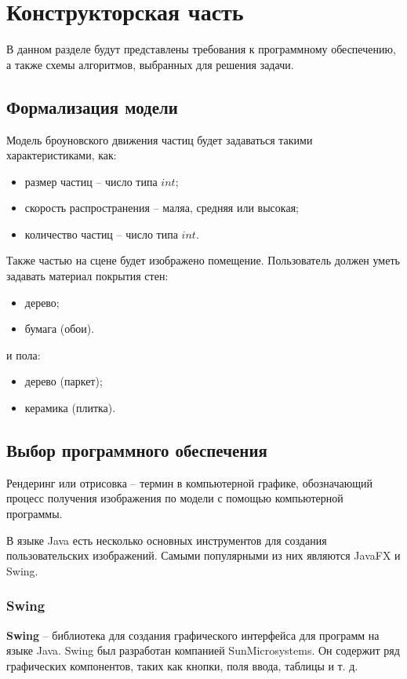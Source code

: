 \chapter{Конструкторская часть}

В данном разделе будут представлены требования к программному обеспечению, а также схемы алгоритмов, выбранных для решения задачи.

\section{Формализация модели}
Модель броуновского движения частиц будет задаваться такими характеристиками, как:
\begin{itemize} 
	\item размер частиц -- число типа $int$;
	\item скорость распространения -- маляа, средняя или высокая;
	\item количество частиц -- число типа $int$.
\end{itemize}

Также частью на сцене будет изображено помещение. Пользователь должен уметь задавать материал покрытия стен:
\begin{itemize} 
	\item дерево;
	\item бумага (обои).
\end{itemize}
и пола:
\begin{itemize} 
	\item дерево (паркет);
	\item керамика (плитка).
\end{itemize}

\section{Выбор программного обеспечения}

Рендеринг или отрисовка -- термин в компьютерной графике, обозначающий процесс получения изображения по модели с помощью компьютерной программы.

В языке Java есть несколько основных инструментов для создания пользовательских изображений. Самыми популярными из них являются JavaFX и Swing.

\subsection{Swing}

\textbf{Swing} -- библиотека для создания графического интерфейса для программ на языке Java. Swing был разработан компанией SunMicrosystems. Он содержит ряд графических компонентов, таких как кнопки, поля ввода, таблицы и т. д.

